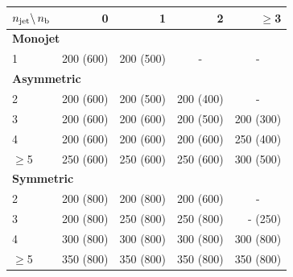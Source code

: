 \newcommand{\dash}{\multicolumn{1}{c}{-}}
\begin{table}[tb]
  \label{tab:binning}
  \centering
  \footnotesize
  \begin{tabular}{ lrrrr }
    \hline
    $n_{\text{jet}} \backslash\, n_{\text{b}}$ & 0         & 1         & 2         & $\geq$3                       \\
    \hline
    \multicolumn{5}{l}{\bf Monojet}                                                              \\
    1                        & 200 (600) & 200 (500) & \dash     & \dash                         \\
    \multicolumn{5}{l}{\bf Asymmetric}                                                           \\
    2                        & 200 (600) & 200 (500) & 200 (400) & \dash                         \\
    3                        & 200 (600) & 200 (600) & 200 (500) & 200 (300)                     \\
    4                        & 200 (600) & 200 (600) & 200 (600) & 250 (400)                     \\
    $\geq$5                  & 250 (600) & 250 (600) & 250 (600) & 300 (500)                     \\
    \multicolumn{5}{l}{\bf Symmetric}                                                            \\
    2                        & 200 (800) & 200 (800) & 200 (600) & \dash                         \\
    3                        & 200 (800) & 250 (800) & 250 (800) & \phantom{0}-\phantom{0} (250) \\
    4                        & 300 (800) & 300 (800) & 300 (800) & 300 (800)                     \\
    $\geq$5                  & 350 (800) & 350 (800) & 350 (800) & 350 (800)                     \\
    \hline
  \end{tabular}
\end{table}

